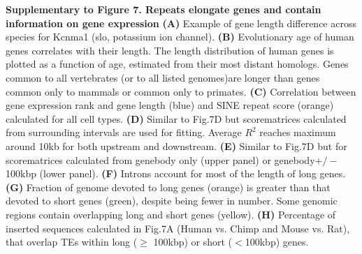 \textbf{Supplementary to Figure 7. Repeats elongate genes and contain information on gene expression}
\textbf{(A)} Example of gene length difference across species for Kcnma1 (slo, potassium ion channel). 
\textbf{(B)} Evolutionary age of human genes correlates with their length. The length distribution of human genes is plotted as a function of age, estimated from their most distant homologs. Genes common to all vertebrates (or to all listed genomes)are longer than genes common only to mammals or common only to primates.
\textbf{(C)} Correlation between gene expression rank and gene length (blue) and SINE repeat score (orange) calculated for all cell types. 
\textbf{(D)} Similar to Fig.7D but scorematrices calculated from surrounding intervals are used for fitting. Average $R^2$ reaches maximum around 10kb for both upstream and downstream. 
\textbf{(E)} Similar to Fig.7D but for scorematrices calculated from genebody only (upper panel) or genebody$+/-$100kbp (lower panel).
\textbf{(F)} Introns account for most of the length of long genes. 
\textbf{(G)} Fraction of genome devoted to long genes (orange) is greater than that devoted to short genes (green), despite being fewer in number. Some genomic regions contain overlapping long and short genes (yellow).
\textbf{(H)} Percentage of inserted sequences calculated in Fig.7A (Human vs. Chimp and Mouse vs. Rat), that overlap TEs within long ($\geq$ 100kbp) or short ($<$100kbp) genes. 